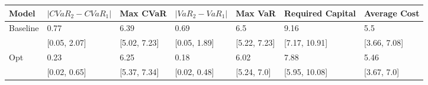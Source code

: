 \begin{tabular}{lllllll}
\toprule
   Model & $|CVaR_2 - CVaR_1|$ &     Max CVaR & $|VaR_2 - VaR_1|$ &      Max VaR & Required Capital & Average Cost \\
\midrule
Baseline &                0.77 &         6.39 &              0.69 &          6.5 &             9.16 &          5.5 \\
         &        [0.05, 2.07] & [5.02, 7.23] &      [0.05, 1.89] & [5.22, 7.23] &    [7.17, 10.91] & [3.66, 7.08] \\
     Opt &                0.23 &         6.25 &              0.18 &         6.02 &             7.88 &         5.46 \\
         &        [0.02, 0.65] & [5.37, 7.34] &      [0.02, 0.48] &  [5.24, 7.0] &    [5.95, 10.08] &  [3.67, 7.0] \\
\bottomrule
\end{tabular}
